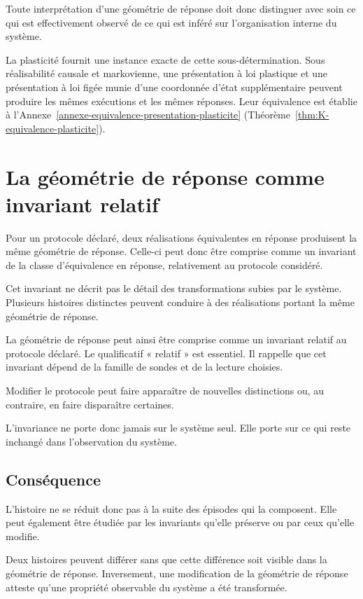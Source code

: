 Toute interprétation d'une géométrie de réponse doit donc distinguer avec soin ce qui est effectivement observé de ce qui est inféré sur l'organisation interne du système.

La plasticité fournit une instance exacte de cette sous-détermination. Sous réalisabilité causale et markovienne, une présentation à loi plastique et une présentation à loi figée munie d'une coordonnée d'état supplémentaire peuvent produire les mêmes exécutions et les mêmes réponses. Leur équivalence est établie à l'Annexe~\ref{annexe-equivalence-presentation-plasticite} (Théorème~\ref{thm:K-equivalence-plasticite}).

\section{La géométrie de réponse comme invariant relatif}
\label{t3-geometrie-invariant-relatif}

Pour un protocole déclaré, deux réalisations équivalentes en réponse produisent la même géométrie de réponse. Celle-ci peut donc être comprise comme un invariant de la classe d'équivalence en réponse, relativement au protocole considéré.

Cet invariant ne décrit pas le détail des transformations subies par le système. Plusieurs histoires distinctes peuvent conduire à des réalisations portant la même géométrie de réponse.

La géométrie de réponse peut ainsi être comprise comme un invariant relatif au protocole déclaré. Le qualificatif « relatif » est essentiel. Il rappelle que cet invariant dépend de la famille de sondes et de la lecture choisies.

Modifier le protocole peut faire apparaître de nouvelles distinctions ou, au contraire, en faire disparaître certaines.

L'invariance ne porte donc jamais sur le système seul. Elle porte sur ce qui reste inchangé dans l'observation du système.

\subsection*{Conséquence}

L'histoire ne se réduit donc pas à la suite des épisodes qui la composent. Elle peut également être étudiée par les invariants qu'elle préserve ou par ceux qu'elle modifie.

Deux histoires peuvent différer sans que cette différence soit visible dans la géométrie de réponse. Inversement, une modification de la géométrie de réponse atteste qu'une propriété observable du système a été transformée.

